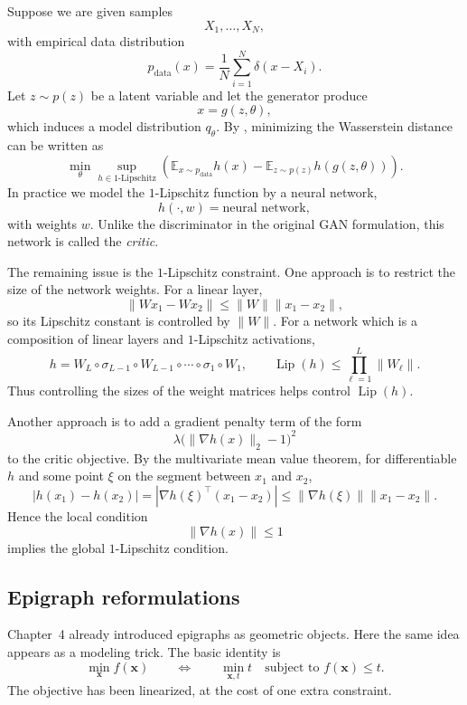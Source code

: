 \begin{example}
\label{ex:ch8-wgan}
Suppose we are given samples
\[
  X_1,\dots,X_N,
\]
with empirical data distribution
\[
  p_{\mathrm{data}}(x)
  =
  \frac1N \sum_{i=1}^N \delta(x-X_i).
\]
Let $z\sim p(z)$ be a latent variable and let the generator produce
\[
  x = g(z,\theta),
\]
which induces a model distribution $q_\theta$. By
, minimizing the Wasserstein distance can be written as
\[
  \min_\theta
  \sup_{h\in 1\text{-Lipschitz}}
  \left(
    \mathbb{E}_{x\sim p_{\mathrm{data}}} h(x)
    -
    \mathbb{E}_{z\sim p(z)} h(g(z,\theta))
  \right).
\]
In practice we model the $1$-Lipschitz function by a neural network,
\[
  h(\cdot,w)=\text{neural network},
\]
with weights $w$. Unlike the discriminator in the original GAN formulation,
this network is called the \emph{critic}.

The remaining issue is the $1$-Lipschitz constraint. One approach is to
restrict the size of the network weights. For a linear layer,
\[
  \|W x_1-W x_2\|
  \le
  \|W\|\|x_1-x_2\|,
\]
so its Lipschitz constant is controlled by $\|W\|$. For a network
which is a composition of linear layers and $1$-Lipschitz activations,
\[
  h
  =
  W_L\circ \sigma_{L-1}\circ W_{L-1}\circ \cdots \circ \sigma_1\circ W_1,
  \qquad
  \operatorname{Lip}(h)
  \le
  \prod_{\ell=1}^L \|W_\ell\|.
\]
Thus controlling the sizes of the weight matrices helps control
$\operatorname{Lip}(h)$. 

Another approach is to add a gradient penalty term of the form
\[
  \lambda\bigl(\|\nabla h(x)\|_2 - 1\bigr)^2
\]
to the critic objective. By the multivariate mean value theorem, for
differentiable $h$ and some point $\xi$ on the segment between $x_1$ and
$x_2$,
\[
  |h(x_1)-h(x_2)|
  =
  |\nabla h(\xi)^\top(x_1-x_2)|
  \le
  \|\nabla h(\xi)\|\|x_1-x_2\|.
\]
Hence the local condition
\[
  \|\nabla h(x)\|\le 1
\]
implies the global $1$-Lipschitz condition. 
\end{example}

\subsection{Epigraph reformulations}
\label{subsec:ch8-epigraph}
Chapter~4 already introduced epigraphs as geometric objects. Here the same
idea appears as a modeling trick. The basic identity is
\[
  \min_{\mathbf{x}} f(\mathbf{x})
  \qquad \Longleftrightarrow \qquad
  \min_{\mathbf{x},t} t
  \quad
  \text{subject to }
  f(\mathbf{x})\le t.
\]
The objective has been linearized, at the cost of one extra constraint.

